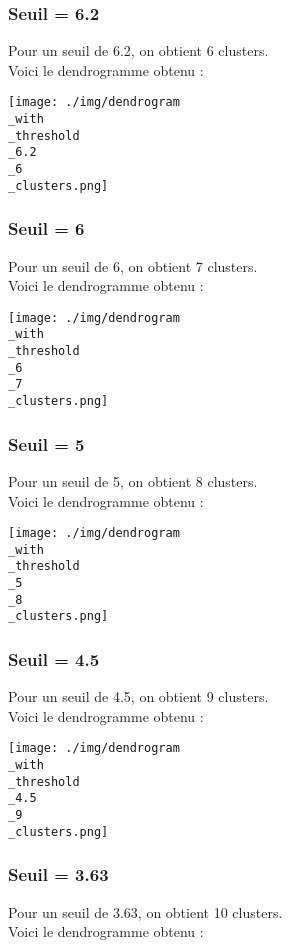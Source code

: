\documentclass{article}
\begin{document}
\subsubsection*{Seuil = 6.2}
Pour un seuil de 6.2, on obtient 6 clusters.\\
Voici le dendrogramme obtenu :

\begin{center}
    \texttt{[image: ./img/dendrogram\\\_with\\\_threshold\\\_6.2\\\_6\\\_clusters.png]}
\end{center}

\subsubsection*{Seuil = 6}
Pour un seuil de 6, on obtient 7 clusters.\\
Voici le dendrogramme obtenu :

\begin{center}
    \texttt{[image: ./img/dendrogram\\\_with\\\_threshold\\\_6\\\_7\\\_clusters.png]}
\end{center}

\subsubsection*{Seuil = 5}
Pour un seuil de 5, on obtient 8 clusters.\\
Voici le dendrogramme obtenu :

\begin{center}
    \texttt{[image: ./img/dendrogram\\\_with\\\_threshold\\\_5\\\_8\\\_clusters.png]}
\end{center}

\subsubsection*{Seuil = 4.5}
Pour un seuil de 4.5, on obtient 9 clusters.\\
Voici le dendrogramme obtenu :

\begin{center}
    \texttt{[image: ./img/dendrogram\\\_with\\\_threshold\\\_4.5\\\_9\\\_clusters.png]}
\end{center}

\subsubsection*{Seuil = 3.63}
Pour un seuil de 3.63, on obtient 10 clusters.\\
Voici le dendrogramme obtenu :
\end{document}
